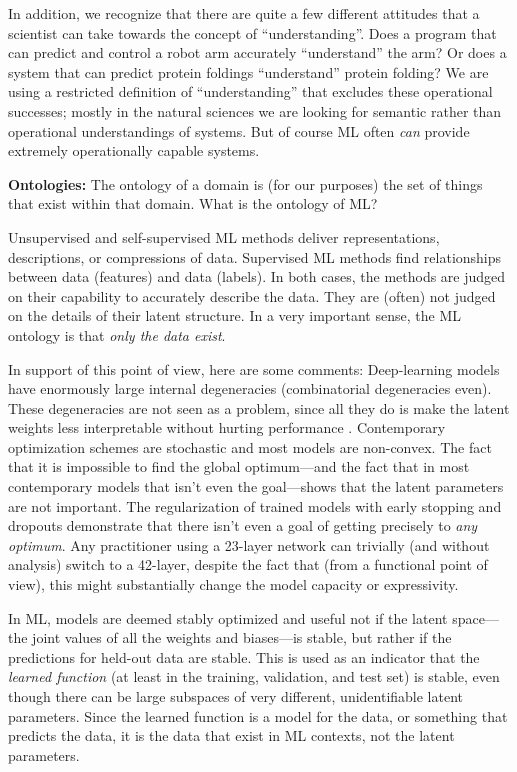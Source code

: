\documentclass{article}
\renewcommand{\paragraph}[1]{\noindent\par\textbf{#1}}
\begin{document}
In addition, we recognize that there are quite a few different attitudes that a scientist can take towards the concept of ``understanding''.
Does a program that can predict and control a robot arm accurately ``understand'' the arm?
Or does a system that can predict protein foldings ``understand'' protein folding?
We are using a restricted definition of ``understanding'' that excludes these operational successes; mostly in the natural sciences we are looking for semantic rather than operational understandings of systems.
But of course ML often \emph{can} provide extremely operationally capable systems.

\paragraph{Ontologies:}
The ontology of a domain is (for our purposes) the set of things that exist within that domain.
What is the ontology of ML?

Unsupervised and self-supervised ML methods deliver representations, descriptions, or compressions of data.
Supervised ML methods find relationships between data (features) and data (labels).
In both cases, the methods are judged on their capability to accurately describe the data.
They are (often) not judged on the details of their latent structure.
In a very important sense, the ML ontology is that \emph{only the data exist}.

In support of this point of view, here are some comments:
Deep-learning models have enormously large internal degeneracies (combinatorial degeneracies even).
These degeneracies are not seen as a problem, since all they do is make the latent weights less interpretable without hurting performance \cite{belkin2019reconciling, bartlett2020benign}.
Contemporary optimization schemes are stochastic \cite{stochastic, adam} and most models are non-convex.
The fact that it is impossible to find the global optimum---and the fact that in most contemporary models that isn't even the goal---shows that the latent parameters are not important.
The regularization of trained models with early stopping \cite{early_stop} and dropouts \cite{dropout} demonstrate that there isn't even a goal of getting precisely to \emph{any optimum}.
Any practitioner using a 23-layer network can trivially (and without analysis) switch to a 42-layer, despite the fact that (from a functional point of view), this might substantially change the model capacity or expressivity.

In ML, models are deemed stably optimized and useful not if the latent space---the joint values of all the weights and biases---is stable, but rather if the predictions for held-out data are stable.
This is used as an indicator that the \emph{learned function} (at least in the training, validation, and test set) is stable, even though there can be large subspaces of very different, unidentifiable latent parameters.
Since the learned function is a model for the data, or something that predicts the data, it is the data that exist in ML contexts, not the latent parameters.
\end{document}
